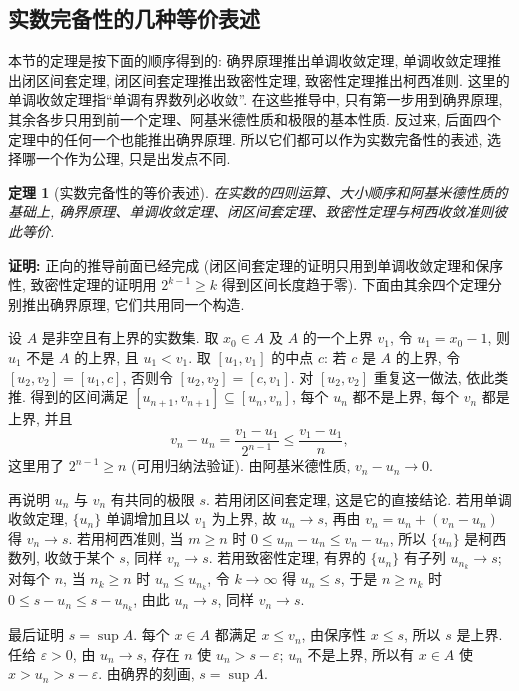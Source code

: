 \documentclass[UTF8,openany]{ctexbook}
\theoremstyle{chinesetextbook}
\newtheorem{theorem}{定理}[section]
\newenvironment{cnproof}{\par\indent\textbf{证明:} \ignorespaces}{\par}
\begin{document}
\subsection{实数完备性的几种等价表述}
本节的定理是按下面的顺序得到的: 确界原理推出单调收敛定理, 单调收敛定理推出闭区间套定理, 闭区间套定理推出致密性定理, 致密性定理推出柯西准则. 这里的单调收敛定理指“单调有界数列必收敛”. 在这些推导中, 只有第一步用到确界原理, 其余各步只用到前一个定理、阿基米德性质和极限的基本性质. 反过来, 后面四个定理中的任何一个也能推出确界原理. 所以它们都可以作为实数完备性的表述, 选择哪一个作为公理, 只是出发点不同.
\begin{theorem}[实数完备性的等价表述]
在实数的四则运算、大小顺序和阿基米德性质的基础上, 确界原理、单调收敛定理、闭区间套定理、致密性定理与柯西收敛准则彼此等价.
\end{theorem}
\begin{cnproof}
正向的推导前面已经完成 (闭区间套定理的证明只用到单调收敛定理和保序性, 致密性定理的证明用 $2^{k-1}\ge k$ 得到区间长度趋于零). 下面由其余四个定理分别推出确界原理, 它们共用同一个构造.

设 $A$ 是非空且有上界的实数集. 取 $x_0\in A$ 及 $A$ 的一个上界 $v_1$, 令 $u_1=x_0-1$, 则 $u_1$ 不是 $A$ 的上界, 且 $u_1<v_1$. 取 $[u_1,v_1]$ 的中点 $c$: 若 $c$ 是 $A$ 的上界, 令 $[u_2,v_2]=[u_1,c]$, 否则令 $[u_2,v_2]=[c,v_1]$. 对 $[u_2,v_2]$ 重复这一做法, 依此类推. 得到的区间满足 $[u_{n+1},v_{n+1}]\subseteq[u_n,v_n]$, 每个 $u_n$ 都不是上界, 每个 $v_n$ 都是上界, 并且
\[
v_n-u_n=\frac{v_1-u_1}{2^{n-1}}\le\frac{v_1-u_1}n,
\]
这里用了 $2^{n-1}\ge n$ (可用归纳法验证). 由阿基米德性质, $v_n-u_n\to0$.

再说明 $u_n$ 与 $v_n$ 有共同的极限 $s$. 若用闭区间套定理, 这是它的直接结论. 若用单调收敛定理, $\{u_n\}$ 单调增加且以 $v_1$ 为上界, 故 $u_n\to s$, 再由 $v_n=u_n+(v_n-u_n)$ 得 $v_n\to s$. 若用柯西准则, 当 $m\ge n$ 时 $0\le u_m-u_n\le v_n-u_n$, 所以 $\{u_n\}$ 是柯西数列, 收敛于某个 $s$, 同样 $v_n\to s$. 若用致密性定理, 有界的 $\{u_n\}$ 有子列 $u_{n_k}\to s$; 对每个 $n$, 当 $n_k\ge n$ 时 $u_n\le u_{n_k}$, 令 $k\to\infty$ 得 $u_n\le s$, 于是 $n\ge n_k$ 时 $0\le s-u_n\le s-u_{n_k}$, 由此 $u_n\to s$, 同样 $v_n\to s$.

最后证明 $s=\sup A$. 每个 $x\in A$ 都满足 $x\le v_n$, 由保序性 $x\le s$, 所以 $s$ 是上界. 任给 $\varepsilon>0$, 由 $u_n\to s$, 存在 $n$ 使 $u_n>s-\varepsilon$; $u_n$ 不是上界, 所以有 $x\in A$ 使 $x>u_n>s-\varepsilon$. 由确界的刻画, $s=\sup A$.
\end{cnproof}
\end{document}
